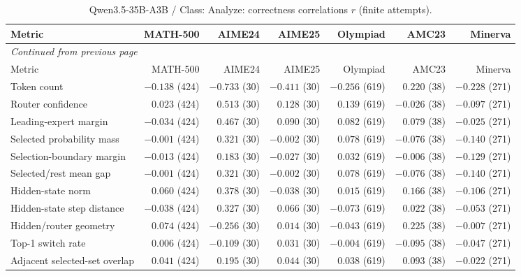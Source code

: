 \begingroup\scriptsize\setlength{\tabcolsep}{4pt}
\begin{longtable}{@{}lrrrrrr@{}}
\caption{Qwen3.5-35B-A3B / Class: Analyze: correctness correlations $r$ (finite attempts).}\label{tab:multi-qwen-class-Analyze}\\
\toprule
Metric & MATH-500 & AIME24 & AIME25 & Olympiad & AMC23 & Minerva \\
\midrule\endfirsthead
\multicolumn{7}{l}{\textit{Continued from previous page}}\\
\toprule
Metric & MATH-500 & AIME24 & AIME25 & Olympiad & AMC23 & Minerva \\
\midrule\endhead
\bottomrule\endfoot
Token count & $-0.138$ (424) & $-0.733$ (30) & $-0.411$ (30) & $-0.256$ (619) & $0.220$ (38) & $-0.228$ (271) \\
Router confidence & $0.023$ (424) & $0.513$ (30) & $0.128$ (30) & $0.139$ (619) & $-0.026$ (38) & $-0.097$ (271) \\
Leading-expert margin & $-0.034$ (424) & $0.467$ (30) & $0.090$ (30) & $0.082$ (619) & $0.079$ (38) & $-0.025$ (271) \\
Selected probability mass & $-0.001$ (424) & $0.321$ (30) & $-0.002$ (30) & $0.078$ (619) & $-0.076$ (38) & $-0.140$ (271) \\
Selection-boundary margin & $-0.013$ (424) & $0.183$ (30) & $-0.027$ (30) & $0.032$ (619) & $-0.006$ (38) & $-0.129$ (271) \\
Selected/rest mean gap & $-0.001$ (424) & $0.321$ (30) & $-0.002$ (30) & $0.078$ (619) & $-0.076$ (38) & $-0.140$ (271) \\
Hidden-state norm & $0.060$ (424) & $0.378$ (30) & $-0.038$ (30) & $0.015$ (619) & $0.166$ (38) & $-0.106$ (271) \\
Hidden-state step distance & $-0.038$ (424) & $0.327$ (30) & $0.066$ (30) & $-0.073$ (619) & $0.022$ (38) & $-0.053$ (271) \\
Hidden/router geometry & $0.074$ (424) & $-0.256$ (30) & $0.014$ (30) & $-0.043$ (619) & $0.225$ (38) & $-0.007$ (271) \\
Top-1 switch rate & $0.006$ (424) & $-0.109$ (30) & $0.031$ (30) & $-0.004$ (619) & $-0.095$ (38) & $-0.047$ (271) \\
Adjacent selected-set overlap & $0.041$ (424) & $0.195$ (30) & $0.044$ (30) & $0.038$ (619) & $0.093$ (38) & $-0.022$ (271) \\
\end{longtable}\endgroup

